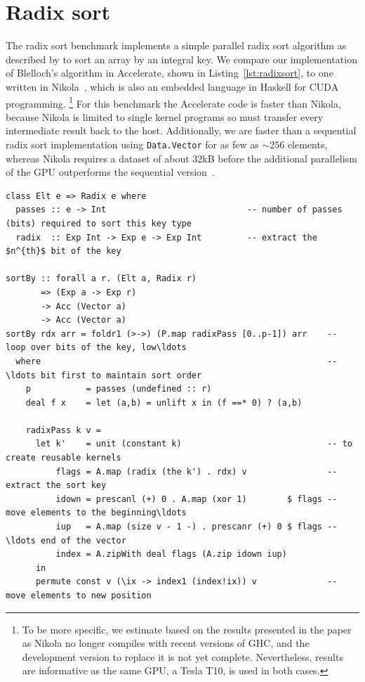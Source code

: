 \section{Radix sort}

The radix sort benchmark implements a simple parallel radix sort algorithm as
described by \citet{Blelloch:1990vl} to sort an array by an integral key. We
compare our implementation of Blelloch's algorithm in Accelerate, shown in
Listing~\ref{lst:radixsort}, to one written in Nikola~\cite{Mainland:2010vj},
which is also an embedded language in Haskell for CUDA programming.%
\footnote{To be more specific, we estimate based on the results presented in the
paper~\cite{Mainland:2010vj} as Nikola no longer compiles with recent versions
of GHC, and the development version to replace it is not yet complete.
Nevertheless, results are informative as the same GPU, a Tesla T10, is used in
both cases.}
For this benchmark the Accelerate code is faster than Nikola, because Nikola is
limited to single kernel programs so must transfer every intermediate result
back to the host. Additionally, we are faster than a sequential radix sort
implementation using \texttt{Data.Vector} for as few as $\sim256$ elements,
whereas Nikola requires a dataset of about 32kB before the additional
parallelism of the GPU outperforms the sequential
version~\cite{Mainland:2010vj}.

\begin{lstlisting}[style=haskell_float
    ,label=lst:radixsort
    ,caption={Radix sort algorithm}]
class Elt e => Radix e where
  passes :: e -> Int                            -- number of passes (bits) required to sort this key type
  radix  :: Exp Int -> Exp e -> Exp Int         -- extract the $n^{th}$ bit of the key

sortBy :: forall a r. (Elt a, Radix r)
       => (Exp a -> Exp r)
       -> Acc (Vector a)
       -> Acc (Vector a)
sortBy rdx arr = foldr1 (>->) (P.map radixPass [0..p-1]) arr    -- loop over bits of the key, low\ldots
  where                                                         -- \ldots bit first to maintain sort order
    p           = passes (undefined :: r)
    deal f x    = let (a,b) = unlift x in (f ==* 0) ? (a,b)

    radixPass k v =
      let k'    = unit (constant k)                             -- to create reusable kernels
          flags = A.map (radix (the k') . rdx) v                -- extract the sort key
          idown = prescanl (+) 0 . A.map (xor 1)        $ flags -- move elements to the beginning\ldots
          iup   = A.map (size v - 1 -) . prescanr (+) 0 $ flags -- \ldots end of the vector
          index = A.zipWith deal flags (A.zip idown iup)
      in
      permute const v (\ix -> index1 (index!ix)) v              -- move elements to new position
\end{lstlisting}

